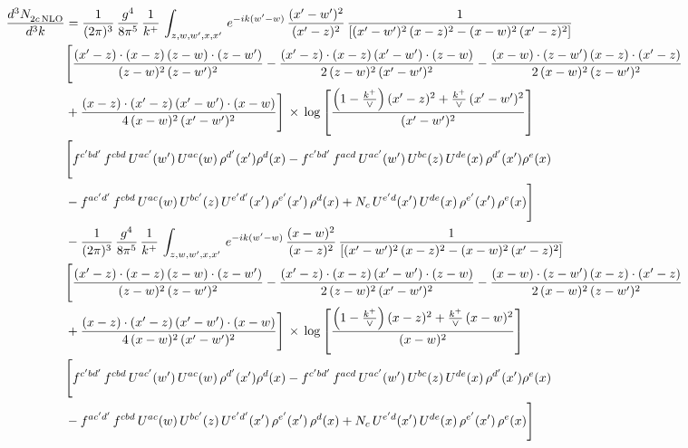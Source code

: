 \documentclass[9pt]{article}
\numberwithin{equation}{section}
\begin{document}
\begin{align}
    \frac{d^{3}N_{2c\,\rm NLO}^{\rm}}{d^{3}k}  & =  \frac{1}{(2\pi)^{3}}\, \frac{g^{4}}{8\pi^{5}}\,\frac{1}{k^{+}}\,\int_{z,w,w^{\prime},x,x'}\, e^{-ik(w^{\prime}-w)}\,\frac{(x'-w')^{2}}{(x'-z)^{2}}\, \frac{1}{\left[(x'-w')^{2}\, (x-z)^{2} - (x-w)^{2}\, (x'-z)^{2}\right]} \notag \\ & \Bigg[\frac{(x'-z)\cdot (x-z)\, (z-w)\cdot (z-w')}{(z-w)^{2}\, (z-w')^{2}}-\frac{(x'-z)\cdot (x-z)\, (x'-w')\cdot (z-w)}{2\, (z-w)^{2}\, (x'-w')^{2}} -\frac{(x-w)\cdot (z-w')\, (x-z)\cdot (x'-z)}{2\, (x-w)^{2}\, (z-w')^{2}}\notag \\ & +\frac{(x-z)\cdot (x'-z)\, (x'-w')\cdot (x-w)}{4\, (x-w)^{2}\, (x'-w')^{2}}\Bigg]\,\times\, \log{\left[\frac{\left(1-\frac{k^{+}}{\vee}\right)(x'-z)^{2}+\frac{k^{+}}{\vee}\,(x'-w')^{2}}{(x'-w')^{2}}\right]} \notag \\ &  \Bigg[f^{c'bd'}\,f^{cbd}\, U^{ac'}(w')\,U^{ac}(w)\,\rho^{d'}(x')\rho^{d}(x)- f^{c'bd'}\,f^{acd}\,U^{ac'}(w')\,U^{bc}(z)\,U^{de}(x)\,\rho^{d'}(x')\rho^{e}(x) \notag \\ & -f^{ac'd'}\,f^{cbd}\,U^{ac}(w)\,U^{bc'}(z)\,U^{e'd'}(x')\,\rho^{e'}(x')\,\rho^{d}(x) +N_{c}\,U^{e'd}(x')\,U^{de}(x)\,\rho^{e'}(x')\,\rho^{e}(x)\Bigg] \notag \\
& -\frac{1}{(2\pi)^{3}}\, \frac{g^{4}}{8\pi^{5}}\,\frac{1}{k^{+}}\,\int_{z,w,w^{\prime},x,x'}\, e^{-ik(w^{\prime}-w)}\,\frac{(x-w)^{2}}{(x-z)^{2}}\, \frac{1}{\left[(x'-w')^{2}\, (x-z)^{2} - (x-w)^{2}\, (x'-z)^{2}\right]} \notag \\ & \Bigg[\frac{(x'-z)\cdot (x-z)\, (z-w)\cdot (z-w')}{(z-w)^{2}\, (z-w')^{2}}-\frac{(x'-z)\cdot (x-z)\, (x'-w')\cdot (z-w)}{2\, (z-w)^{2}\, (x'-w')^{2}} -\frac{(x-w)\cdot (z-w')\, (x-z)\cdot (x'-z)}{2\, (x-w)^{2}\, (z-w')^{2}}\notag \\ & +\frac{(x-z)\cdot (x'-z)\, (x'-w')\cdot (x-w)}{4\, (x-w)^{2}\, (x'-w')^{2}}\Bigg]\,\times\, \log{\left[\frac{\left(1-\frac{k^{+}}{\vee}\right)(x-z)^{2}+\frac{k^{+}}{\vee}\,(x-w)^{2}}{(x-w)^{2}}\right]} \notag \\ &  \Bigg[f^{c'bd'}\,f^{cbd}\, U^{ac'}(w')\,U^{ac}(w)\,\rho^{d'}(x')\rho^{d}(x)- f^{c'bd'}\,f^{acd}\,U^{ac'}(w')\,U^{bc}(z)\,U^{de}(x)\,\rho^{d'}(x')\rho^{e}(x) \notag \\ & -f^{ac'd'}\,f^{cbd}\,U^{ac}(w)\,U^{bc'}(z)\,U^{e'd'}(x')\,\rho^{e'}(x')\,\rho^{d}(x) +N_{c}\,U^{e'd}(x')\,U^{de}(x)\,\rho^{e'}(x')\,\rho^{e}(x)\Bigg]
\end{align}
\end{document}
